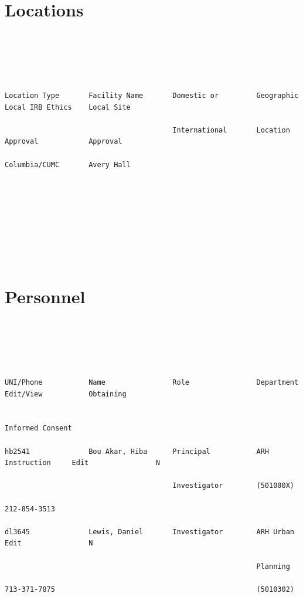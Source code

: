 \documentclass[10pt, letterpaper]{article}
\begin{document}
\section*{Locations}

{\footnotesize

\begin{verbatim}





Location Type       Facility Name       Domestic or         Geographic          Local IRB Ethics    Local Site

                                        International       Location            Approval            Approval

Columbia/CUMC       Avery Hall









\end{verbatim}

}

\section*{Personnel}

{\footnotesize

\begin{verbatim}





UNI/Phone           Name                Role                Department          Edit/View           Obtaining

                                                                                                    Informed Consent

hb2541              Bou Akar, Hiba      Principal           ARH Instruction     Edit                N

                                        Investigator        (501000X)

212-854-3513

dl3645              Lewis, Daniel       Investigator        ARH Urban           Edit                N

                                                            Planning

713-371-7875                                                (5010302)





\end{verbatim}

}
\end{document}
